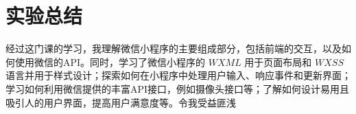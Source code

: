 \section{实验总结}
    \par 经过这门课的学习，我理解微信小程序的主要组成部分，包括前端的交互，以及如何使用微信的API。同时，学习了微信小程序的 $WXML$ 用于页面布局和 $WXSS$ 语言并用于样式设计；探索如何在小程序中处理用户输入、响应事件和更新界面；学习如何利用微信提供的丰富API接口，例如摄像头接口等；了解如何设计易用且吸引人的用户界面，提高用户满意度等。令我受益匪浅